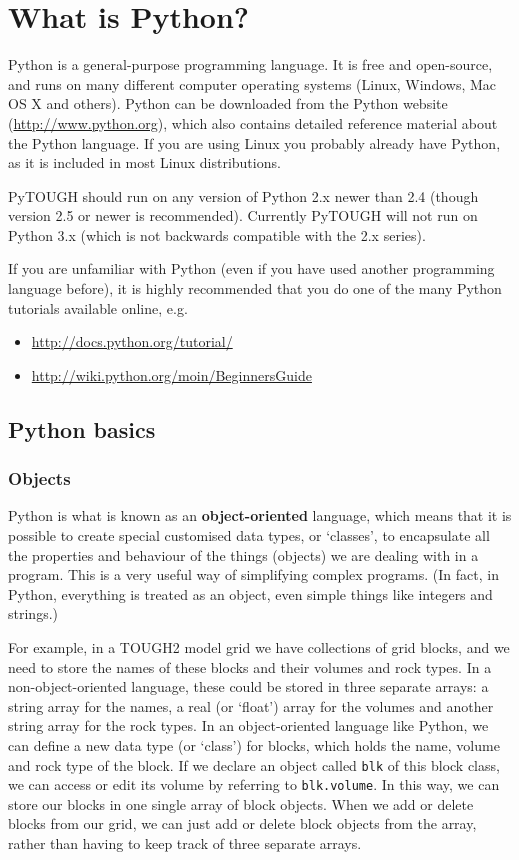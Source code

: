 \section{What is Python?}

Python is a general-purpose programming language.  It is free and open-source, and runs on many different computer operating systems (Linux, Windows, Mac OS X and others).  Python can be downloaded from the Python website (\url{http://www.python.org}), which also contains detailed reference material about the Python language.  If you are using Linux you probably already have Python, as it is included in most Linux distributions.

PyTOUGH should run on any version of Python 2.x newer than 2.4 (though version 2.5 or newer is recommended).  Currently PyTOUGH will not run on Python 3.x (which is not backwards compatible with the 2.x series).

If you are unfamiliar with Python (even if you have used another programming language before), it is highly recommended that you do one of the many Python tutorials available online, e.g.

\begin{itemize}
  \item \url{http://docs.python.org/tutorial/}
  \item \url{http://wiki.python.org/moin/BeginnersGuide}
\end{itemize}

\subsection{Python basics}

\subsubsection{Objects}

Python is what is known as an \textbf{object-oriented} language, which means that it is possible to create special customised data types, or `classes', to encapsulate all the properties and behaviour of the things (objects) we are dealing with in a program.  This is a very useful way of simplifying complex programs.  (In fact, in Python, everything is treated as an object, even simple things like integers and strings.)

For example, in a TOUGH2 model grid we have collections of grid blocks, and we need to store the names of these blocks and their volumes and rock types.  In a non-object-oriented language, these could be stored in three separate arrays: a string array for the names, a real (or `float') array for the volumes and another string array for the rock types.  In an object-oriented language like Python, we can define a new data type (or `class') for blocks, which holds the name, volume and rock type of the block.  If we declare an object called \texttt{blk} of this block class, we can access or edit its volume by referring to \texttt{blk.volume}.  In this way, we can store our blocks in one single array of block objects.  When we add or delete blocks from our grid, we can just add or delete block objects from the array, rather than having to keep track of three separate arrays.


